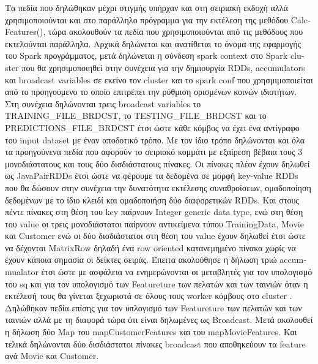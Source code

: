 \documentclass{report}
\begin{document}
Τα πεδία που δηλώθηκαν μέχρι στιγμής υπήρχαν και στη σειριακή εκδοχή αλλά χρησιμοποιούνται και στο παράλληλο πρόγραμμα για την εκτέλεση της μεθόδου \textlatin{CalcFeatures}(), τώρα ακολουθούν τα πεδία που χρησιμοποιούνται από τις μεθόδους που εκτελούνται παράλληλα. Αρχικά δηλώνεται και ανατίθεται το όνομα της εφαρμογής του \textlatin{Spark} προγράμματος, μετά δηλώνεται η σύνδεση \textlatin{spark context} στο \textlatin{Spark cluster} που θα χρησιμοποιηθεί στην συνέχεια για την δημιουργία \textlatin{RDDs, accumulators} και \textlatin{broadcast variables} σε εκείνο τον \textlatin{cluster} και το \textlatin{spark conf} που χρησμιμοποιείται από το προηγούμενο το οποίο επιτρέπει την ρύθμιση ορισμένων κοινών ιδιοτήτων. Στη συνέχεια δηλώνονται τρεις \textlatin{broadcast variables} το \textlatin{TRAINING\_FILE\_BRDCST}, το \textlatin{TESTING\_FILE\_BRDCST} και το \textlatin{PREDICTIONS\_FILE\_BRDCST} έτσι ώστε κάθε κόμβος να έχει ένα αντίγραφο του \textlatin{input dataset} με έναν αποδοτικό τρόπο. Με τον ίδιο τρόπο δηλώνονται και όλα τα προηγούνενα πεδία που αφορούν το σειριακό κομμάτι με εξαίρεση βέβαια τους 3 μονοδιάστατους και τους δύο δισδιάστατους πίνακες. Οι πίνακες πλέον έχουν δηλωθεί ως \textlatin{JavaPairRDDs} έτσι ώστε να φέρουμε τα δεδομένα σε μορφή \textlatin{key-value RDDs} που θα δώσουν στην συνέχεια την δυνατότητα εκτέλεσης συναθροίσεων, ομαδοποίηση δεδομένων με το ίδιο κλειδί και ομαδοποιήση δύο διαφορετικών \textlatin{RDDs}. Και στους πέντε πίνακες στη θέση του \textlatin{key} παίρνουν \textlatin{Integer generic data type}, ενώ στη θέση του \textlatin{value} οι τρεις μονοδιάστατοι παίρνουν αντικείμενα τύπου \textlatin{TrainingData, Movie} και \textlatin{Customer} ενώ οι δύο δισδιάστατοι στη θέση του value έχουν δηλωθεί έτσι ώστε να δέχονται \textlatin{MatrixRow} δηλαδή ένα \textlatin{row oriented} κατανεμημένο πίνακα χωρίς να έχουν κάποια σημασία οι δείκτες σειράς. Έπειτα ακολούθησε η δήλωση τριώ \textlatin{accummualator} έτσι ώστε με ασφάλεια να ενημερώνονται οι μεταβλητές για τον υπολογισμό του \textlatin{sq} και για τον υπολογισμό των \textlatin{Featureture} των πελατών και των ταινιών όταν η εκτέλεσή τους θα γίνεται ξεχωριστά σε όλους τους \textlatin{worker} κόμβους στο \textlatin{cluster} . Δηλώθηκαν πεδία επίσης για τον υπλογισμό των \textlatin{Featureture} των πελατών και των ταινιών αλλά με τη διαφορά τώρα ότι είναι δηλωμένες ως \textlatin{Broadcast}. Μετά ακολουθεί η δήλωση δύο \textlatin{Map} του \textlatin{mapCustomerFeatures} και του \textlatin{mapMovieFeatures}. Και τελικά δηλώνονται δύο δισδιάστατοι πίνακες \textlatin{broadcast} που  αποθηκεύουν τα \textlatin{feature} ανά \textlatin{Movie} και \textlatin{Customer}. 
 
\end{document}
